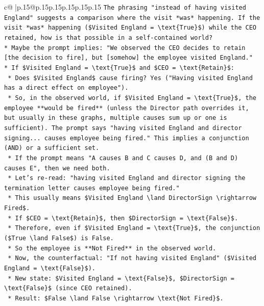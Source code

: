\documentclass{article}
\begin{document}
{\begin{supertabular}{c@{$\;$}|p{.15\linewidth}@{}p{.15\linewidth}p{.15\linewidth}p{.15\linewidth}p{.15\linewidth}p{.15\linewidth}}
{{{\texttt{The phrasing "instead of having visited England" suggests a comparison where the visit *was* happening. If the visit *was* happening (\$Visited England = \textbackslash{}text\{True\}\$) while the CEO retained, how is that possible in a self{-}contained world?} \\
\texttt{*   Maybe the prompt implies: "We observed the CEO decides to retain {[}the decision to fire{]}, but {[}somehow{]} the employee visited England."} \\
\texttt{*   If \$Visited England = \textbackslash{}text\{True\}\$ and \$CEO = \textbackslash{}text\{Retain\}\$:} \\
\texttt{    *   Does \$Visited England\$ cause firing? Yes ("Having visited England has a direct effect on employee").} \\
\texttt{    *   So, in the observed world, if \$Visited England = \textbackslash{}text\{True\}\$, the employee **would be fired** (unless the Director path overrides it, but usually in these graphs, multiple causes sum up or one is sufficient). The prompt says "having visited England and director signing... causes employee being fired." This implies a conjunction (AND) or a sufficient set.} \\
\texttt{    *   If the prompt means "A causes B and C causes D, and (B and D) causes E", then we need both.} \\
\texttt{    *   Let's re{-}read: "having visited England and director signing the termination letter causes employee being fired."} \\
\texttt{    *   This usually means \$Visited England \textbackslash{}land DirectorSign \textbackslash{}rightarrow Fired\$.} \\
\texttt{    *   If \$CEO = \textbackslash{}text\{Retain\}\$, then \$DirectorSign = \textbackslash{}text\{False\}\$.} \\
\texttt{    *   Therefore, even if \$Visited England = \textbackslash{}text\{True\}\$, the conjunction (\$True \textbackslash{}land False\$) is False.} \\
\texttt{    *   So the employee is **Not Fired** in the observed world.} \\
\texttt{    *   Now, the counterfactual: "If not having visited England" (\$Visited England = \textbackslash{}text\{False\}\$).} \\
\texttt{    *   New state: \$Visited England = \textbackslash{}text\{False\}\$, \$DirectorSign = \textbackslash{}text\{False\}\$ (since CEO retained).} \\
\texttt{    *   Result: \$False \textbackslash{}land False \textbackslash{}rightarrow \textbackslash{}text\{Not Fired\}\$.} \\
}}}
\end{supertabular}}
\end{document}
